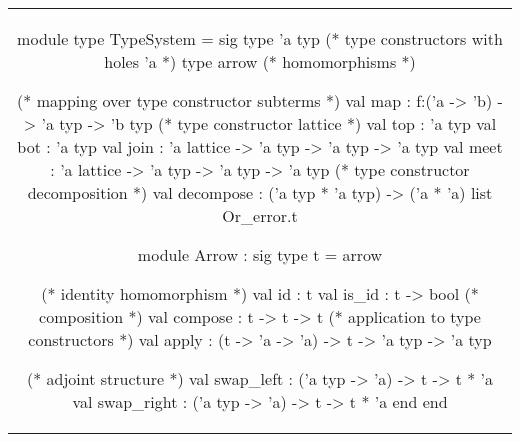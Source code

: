 \begin{tabular}{c}
\begin{ocaml}
module type TypeSystem = sig
  type 'a typ  (* type constructors with holes 'a *)
  type arrow   (* homomorphisms *)

  (* mapping over type constructor subterms *)
  val map : f:('a -> 'b) -> 'a typ -> 'b typ
  (* type constructor lattice *)
  val top : 'a typ
  val bot : 'a typ
  val join : 'a lattice -> 'a typ -> 'a typ -> 'a typ
  val meet : 'a lattice -> 'a typ -> 'a typ -> 'a typ
  (* type constructor decomposition *)
  val decompose : ('a typ * 'a typ) -> ('a * 'a) list Or_error.t

  module Arrow : sig
    type t = arrow

    (* identity homomorphism *)
    val id : t
    val is_id : t -> bool
    (* composition *)
    val compose : t -> t -> t
    (* application to type constructors *)
    val apply : (t -> 'a -> 'a) -> t -> 'a typ -> 'a typ

    (* adjoint structure *)
    val swap_left : ('a typ -> 'a) -> t -> t * 'a
    val swap_right : ('a typ -> 'a) -> t -> t * 'a
  end
end
\end{ocaml}
\end{tabular}
